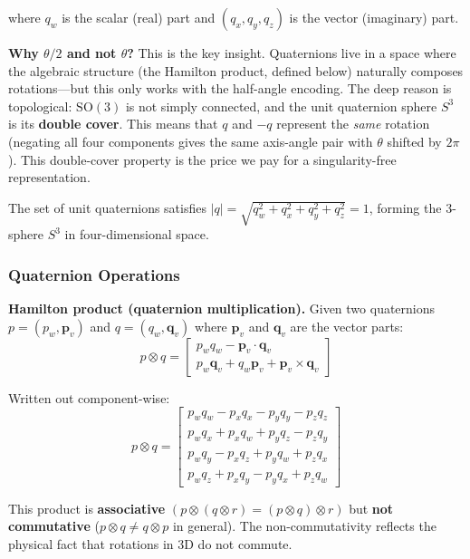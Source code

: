 where $q_w$ is the scalar (real) part and $(q_x, q_y, q_z)$ is the vector (imaginary) part.

\textbf{Why $\theta/2$ and not $\theta$?} This is the key insight. Quaternions live in a space where the algebraic structure (the Hamilton product, defined below) naturally composes rotations---but this only works with the half-angle encoding. The deep reason is topological: $\mathrm{SO}(3)$ is not simply connected, and the unit quaternion sphere $S^3$ is its \textbf{double cover}. This means that $q$ and $-q$ represent the \textit{same} rotation (negating all four components gives the same axis-angle pair with $\theta$ shifted by $2\pi$). This double-cover property is the price we pay for a singularity-free representation.

The set of unit quaternions satisfies $|q| = \sqrt{q_w^2 + q_x^2 + q_y^2 + q_z^2} = 1$, forming the 3-sphere $S^3$ in four-dimensional space.

\subsubsection{Quaternion Operations}

\textbf{Hamilton product (quaternion multiplication).} Given two quaternions $p = (p_w, \mathbf{p}_v)$ and $q = (q_w, \mathbf{q}_v)$ where $\mathbf{p}_v$ and $\mathbf{q}_v$ are the vector parts:
\begin{equation}
p \otimes q = \begin{bmatrix}
p_w q_w - \mathbf{p}_v \cdot \mathbf{q}_v \\
p_w \mathbf{q}_v + q_w \mathbf{p}_v + \mathbf{p}_v \times \mathbf{q}_v
\end{bmatrix}
\end{equation}

Written out component-wise:
\begin{equation}
p \otimes q = \begin{bmatrix}
p_w q_w - p_x q_x - p_y q_y - p_z q_z \\
p_w q_x + p_x q_w + p_y q_z - p_z q_y \\
p_w q_y - p_x q_z + p_y q_w + p_z q_x \\
p_w q_z + p_x q_y - p_y q_x + p_z q_w
\end{bmatrix}
\end{equation}

This product is \textbf{associative} $(p \otimes (q \otimes r) = (p \otimes q) \otimes r)$ but \textbf{not commutative} ($p \otimes q \neq q \otimes p$ in general). The non-commutativity reflects the physical fact that rotations in 3D do not commute.

